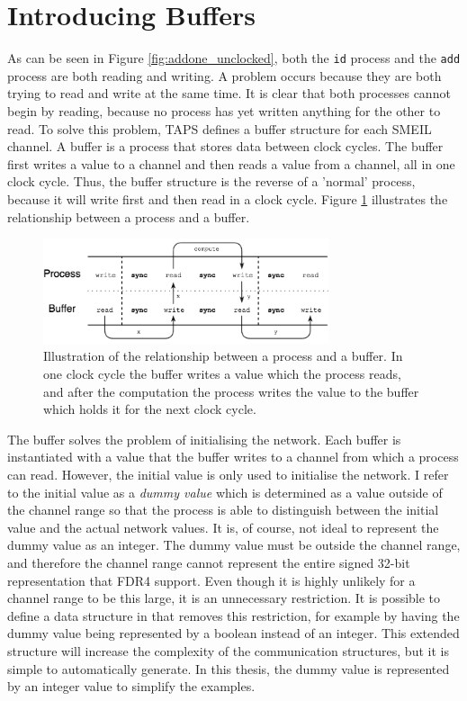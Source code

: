 \section{Introducing Buffers}
As can be seen in Figure \ref{fig:addone_unclocked}, both the \texttt{id} process and the \texttt{add} process are both reading and writing. A problem occurs because they are both trying to read and write at the same time. It is clear that both processes cannot begin by reading, because no process has yet written anything for the other to read.
To solve this problem, TAPS defines a buffer structure for each SMEIL channel. A buffer is a process that stores data between clock cycles. The buffer first writes a value to a channel and then reads a value from a channel, all in one clock cycle. Thus, the buffer structure is the reverse of a 'normal' process, because it will write first and then read in a clock cycle. Figure \ref{fig:clock_cycle} illustrates the relationship between a process and a buffer.\\

\begin{figure}
\centering
\includegraphics[width=0.75\textwidth]{./figures/clock_cycle_thesis.png}
\caption{Illustration of the relationship between a process and a buffer. In one clock cycle the buffer writes a value which the process reads, and after the computation the process writes the value to the buffer which holds it for the next clock cycle.}
\label{fig:clock_cycle}
\end{figure}
The buffer solves the problem of initialising the network. Each buffer is instantiated with a value that the buffer writes to a channel from which a process can read. However, the initial value is only used to initialise the network. I refer to the initial value as a \textit{dummy value} which is determined as a value outside of the channel range so that the process is able to distinguish between the initial value and the actual network values.
It is, of course, not ideal to represent the dummy value as an integer. The dummy value must be outside the channel range, and therefore the channel range cannot represent the entire signed 32-bit representation that FDR4 support. Even though it is highly unlikely for a channel range to be this large, it is an unnecessary restriction. It is possible to define a data structure in \cspm{} that removes this restriction, for example by having the dummy value being represented by a boolean instead of an integer. This extended structure will increase the complexity of the communication structures, but it is simple to automatically generate.
In this thesis, the dummy value is represented by an integer value to simplify the examples.\\


